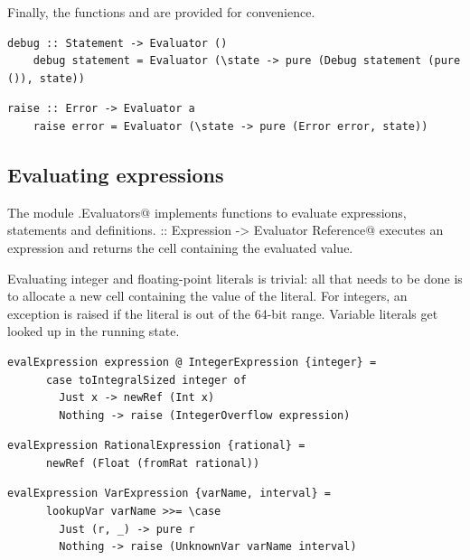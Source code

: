 \documentclass[UdineBachThesis,american,11pt,draft]{PhdThesis}
\begin{document}
  Finally, the functions \lstinline@debug@ and \lstinline@raise@ are provided
  for convenience.

  \begin{lstlisting}[gobble=4,basicstyle=\ttfamily\small]
    debug :: Statement -> Evaluator ()
    debug statement = Evaluator (\state -> pure (Debug statement (pure ()), state))
  \end{lstlisting}

  \begin{lstlisting}[gobble=4,basicstyle=\ttfamily\small]
    raise :: Error -> Evaluator a
    raise error = Evaluator (\state -> pure (Error error, state))
  \end{lstlisting}

  \subsection{Evaluating expressions}

  The module \lstinline@Devin.Evaluators@ implements functions to evaluate
  expressions, statements and definitions.
  \lstinline@evalExpression :: Expression -> Evaluator Reference@ executes an
  expression and returns the cell containing the evaluated value.

  Evaluating integer and floating-point literals is trivial: all that needs to
  be done is to allocate a new cell containing the value of the literal. For
  integers, an exception is raised if the literal is out of the 64-bit range.
  Variable literals get looked up in the running state.

  \begin{lstlisting}[gobble=4,basicstyle=\ttfamily\small]
    evalExpression expression @ IntegerExpression {integer} =
      case toIntegralSized integer of
        Just x -> newRef (Int x)
        Nothing -> raise (IntegerOverflow expression)
  \end{lstlisting}

  \begin{lstlisting}[gobble=4,basicstyle=\ttfamily\small]
    evalExpression RationalExpression {rational} =
      newRef (Float (fromRat rational))
  \end{lstlisting}

  \begin{lstlisting}[gobble=4,basicstyle=\ttfamily\small]
    evalExpression VarExpression {varName, interval} =
      lookupVar varName >>= \case
        Just (r, _) -> pure r
        Nothing -> raise (UnknownVar varName interval)
  \end{lstlisting}
\end{document}
